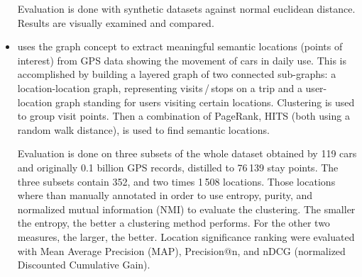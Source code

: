 \begin{itemize}
Evaluation is done with synthetic datasets against normal euclidean distance. Results are visually examined and compared.

\item \textcite{Cao2010} uses the graph concept to extract meaningful semantic locations (points of interest) from GPS data showing the movement of cars in daily use. This is accomplished by building a layered graph of two connected sub-graphs: a location-location graph, representing visits\,/\,stops on a trip and a user-location graph standing for users visiting certain locations. Clustering is used to group visit points. Then a combination of PageRank, HITS (both using a random walk distance), is used to find semantic locations.

Evaluation is done on three subsets of the whole dataset obtained by 119 cars and originally 0.1 billion GPS records, distilled to 76\,139 stay points. The three subsets contain 352, and two times 1\,508 locations. Those locations where than manually annotated in order to use entropy, purity, and normalized mutual information (NMI) to evaluate the clustering. The smaller the entropy, the better a clustering method performs. For the other two measures, the larger, the better. Location significance ranking were evaluated with Mean Average Precision (MAP), Precision@n, and nDCG (normalized Discounted Cumulative Gain).
\end{itemize}

